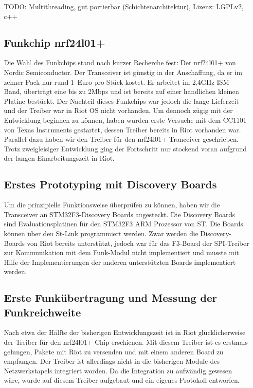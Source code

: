 \documentclass{IEEEtran}
\begin{document}
        TODO: Multithreading, gut portierbar (Schichtenarchitektur), Lizenz: LGPLv2, c++

    \subsection{Funkchip nrf24l01+}
    Die Wahl des Funkchips stand nach kurzer Recherche fest: Der nrf24l01+ von Nordic Semiconductor. Der Transceiver ist günstig in der Anschaffung, da er im zehner-Pack nur rund 1~Euro pro Stück kostet. Er arbeitet im 2,4GHz ISM-Band, überträgt eine bis zu 2Mbps und ist bereits auf einer handlichen kleinen Platine bestückt. Der Nachteil dieses Funkchips war jedoch die lange Lieferzeit und der Treiber war in Riot OS nicht vorhanden.
    Um dennoch zügig mit der Entwicklung beginnen zu können, haben wurden erste Versuche mit dem CC1101 von Texas Instruments gestartet, dessen Treiber bereits in Riot vorhanden war. Parallel dazu haben wir den Treiber für den nrf24l01+ Tranceiver geschrieben. Trotz zweigleisiger Entwicklung ging der Fortschritt nur stockend voran aufgrund der langen Einarbeitungszeit in Riot.

    \subsection{Erstes Prototyping mit Discovery Boards}
    Um die prinzipielle Funktionsweise überprüfen zu können, haben wir die Transceiver an STM32F3-Discovery Boards angesteckt. Die Discovery Boards sind Evaluationsplatinen für den STM32F3 ARM Prozessor von ST. Die Boards können über den St-Link programmiert werden.
    Zwar werden die Discovery-Boards von Riot bereits unterstützt, jedoch war für das F3-Board der SPI-Treiber zur Kommunikation mit dem Funk-Modul nicht implementiert und musste mit Hilfe der Implementierungen der anderen unterstützten Boards implementiert werden.

    \subsection{Erste Funkübertragung und Messung der Funkreichweite}
        Nach etwa der Hälfte der bisherigen Entwicklungszeit ist in Riot glücklicherweise der Treiber für den nrf24l01+ Chip erschienen. Mit diesem Treiber ist es erstmals gelungen, Pakete mit Riot zu versenden und mit einem anderen Board zu empfangen.
        Der Treiber ist allerdings nicht in die bisherigen Module des Netzwerkstapels integriert worden. Da die Integration zu aufwändig gewesen wäre, wurde auf diesem Treiber aufgebaut und ein eigenes Protokoll entworfen.
\end{document}
